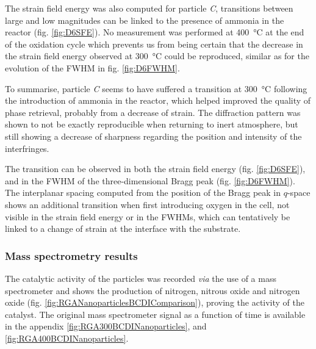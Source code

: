 The strain field energy was also computed for particle \textit{C}, transitions between large and low magnitudes can be linked to the presence of ammonia in the reactor (fig. \ref{fig:D6SFE}).
No measurement was performed at \qty{400}{\degreeCelsius} at the end of the oxidation cycle which prevents us from being certain that the decrease in the strain field energy observed at \qty{300}{\degreeCelsius} could be reproduced, similar as for the evolution of the FWHM in fig. \ref{fig:D6FWHM}.

To summarise, particle \textit{C} seems to have suffered a transition at \qty{300}{\degreeCelsius} following the introduction of ammonia in the reactor, which helped improved the quality of phase retrieval, probably from a decrease of strain.
The diffraction pattern was shown to not be exactly reproducible when returning to inert atmosphere, but still showing a decrease of sharpness regarding the position and intensity of the interfringes.

The transition can be observed in both the strain field energy (fig. \ref{fig:D6SFE}), and in the FWHM of the three-dimensional Bragg peak (fig. \ref{fig:D6FWHM}).
The interplanar spacing computed from the position of the Bragg peak in $q$-space shows an additional transition when first introducing oxygen in the cell, not visible in the strain field energy or in the FWHMs, which can tentatively be linked to a change of strain at the interface with the substrate.

\subsubsection{Mass spectrometry results}

The catalytic activity of the particles was recorded \textit{via} the use of a mass spectrometer and shows the production of nitrogen, nitrous oxide and nitrogen oxide (fig. \ref{fig:RGANanoparticlesBCDIComparison}), proving the activity of the catalyst.
The original mass spectrometer signal as a function of time is available in the appendix \ref{fig:RGA300BCDINanoparticles}, and \ref{fig:RGA400BCDINanoparticles}.

